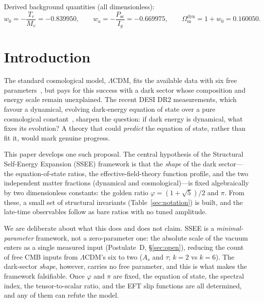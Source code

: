 \documentclass[a4paper,11pt]{article}
\newcommand{\Om}{\Omega_{\mathrm{m}}}
\begin{document}
\noindent Derived background quantities (all dimensionless):
\begin{equation*}
w_0=-\frac{T_r}{M_v}=-0.839950,\qquad
w_a=-\frac{P_{\mathrm{sc}}}{I_g}=-0.669975,\qquad
\Om^{\mathrm{dyn}}=1+w_0=0.160050 .
\end{equation*}


\section{Introduction}
\label{sec:intro}

The standard cosmological model, $\Lambda$CDM, fits the available data with six
free parameters~\citep{Planck2018}, but pays for this success with a dark sector whose composition
and energy scale remain unexplained. The recent DESI DR2 measurements, which
favour a dynamical, evolving dark-energy equation of state over a pure
cosmological constant~\citep{AbdulKarim2025}, sharpen the question: if dark
energy is dynamical, what fixes its evolution? A theory that could
\emph{predict} the equation of state, rather than fit it, would mark genuine
progress.

This paper develops one such proposal. The central hypothesis of the
Structural Self-Energy Expansion (SSEE) framework is that the \emph{shape} of
the dark sector---the equation-of-state ratios, the effective-field-theory
function profile, and the two independent matter fractions (dynamical and
cosmological)---is fixed algebraically by two dimensionless constants: the golden
ratio $\varphi=(1+\sqrt5)/2$ and $\pi$. From these, a small set of structural
invariants (Table~\ref{sec:notation}) is built, and the late-time observables
follow as bare ratios with no tuned amplitude.

We are deliberate about what this does and does not claim. SSEE is a
\emph{minimal-parameter} framework, not a zero-parameter one: the absolute scale
of the vacuum enters as a single measured input (Postulate~D,
\S\ref{sec:open}), reducing the count of free CMB inputs from $\Lambda$CDM's
six to two ($A_s$ and $\tau$; $k=2$ vs $k=6$). The dark-sector \emph{shape}, however, carries no free
parameter, and this is what makes the framework falsifiable. Once $\varphi$ and
$\pi$ are fixed, the equation of state, the spectral index, the
tensor-to-scalar ratio, and the EFT slip functions are all determined, and any
of them can refute the model.
\end{document}
